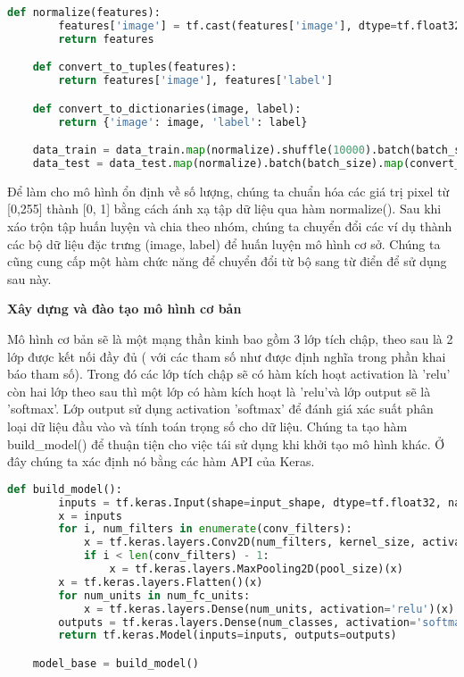 \begin{lstlisting}[language=Python]
    def normalize(features):
        features['image'] = tf.cast(features['image'], dtype=tf.float32) / 255.0
        return features

    def convert_to_tuples(features):
        return features['image'], features['label']

    def convert_to_dictionaries(image, label):
        return {'image': image, 'label': label}

    data_train = data_train.map(normalize).shuffle(10000).batch(batch_size).map(convert_to_tuples)
    data_test = data_test.map(normalize).batch(batch_size).map(convert_to_tuples)

\end{lstlisting}

Để làm cho mô hình ổn định về số lượng, chúng ta chuẩn hóa các giá trị pixel từ [0,255] thành [0, 1] bằng cách ánh xạ tập dữ liệu qua hàm normalize(). Sau khi xáo 
trộn tập huấn luyện và chia theo nhóm, chúng ta chuyển đổi các ví dụ thành các bộ dữ liệu đặc trưng (image, label) để huấn luyện mô hình cơ sở. Chúng ta 
cũng cung cấp một hàm chức năng để chuyển đổi từ bộ sang từ điển để sử dụng sau này.

\textbf{Xây dựng và đào tạo mô hình cơ bản}

Mô hình cơ bản sẽ là một mạng thần kinh bao gồm 3 lớp tích chập, theo sau là 2 lớp được kết nối đầy đủ ( với các tham số như được định nghĩa trong phần khai báo tham số). 
Trong đó các lớp tích chập sẽ có hàm kích hoạt activation là 'relu' còn hai lớp theo sau thì một lớp có hàm kích hoạt là 'relu'và lớp output sẽ là 'softmax'. Lớp output sử dụng 
activation 'softmax' để đánh giá xác suất phân loại dữ liệu đầu vào và tính toán trọng số cho dữ liệu.
Chúng ta tạo hàm build\_model() để thuận tiện cho việc tái sử dụng khi khởi tạo mô hình khác. 
Ở đây chúng ta xác định nó bằng các hàm API của Keras. 

\begin{lstlisting}[language=Python]
    def build_model():
        inputs = tf.keras.Input(shape=input_shape, dtype=tf.float32, name='image')
        x = inputs
        for i, num_filters in enumerate(conv_filters):
            x = tf.keras.layers.Conv2D(num_filters, kernel_size, activation='relu')(x)
            if i < len(conv_filters) - 1:
                x = tf.keras.layers.MaxPooling2D(pool_size)(x)
        x = tf.keras.layers.Flatten()(x)
        for num_units in num_fc_units:
            x = tf.keras.layers.Dense(num_units, activation='relu')(x)
        outputs = tf.keras.layers.Dense(num_classes, activation='softmax')(x)
        return tf.keras.Model(inputs=inputs, outputs=outputs)

    model_base = build_model()
\end{lstlisting}

